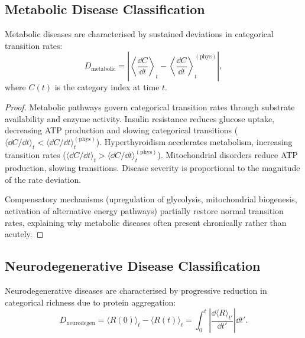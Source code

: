 \subsection{Metabolic Disease Classification}
\label{sec:ch07-metabolic-disease}

\begin{theorem}
\label{thm:ch07-metabolic-disease}
Metabolic diseases are characterised by sustained deviations in categorical
transition rates:
\begin{equation}
  D_{\mathrm{metabolic}}
  = \left|\left\langle\frac{\dd C}{\dd t}\right\rangle_t
    - \left\langle\frac{\dd C}{\dd t}\right\rangle_t^{(\mathrm{phys})}\right|,
  \label{eq:ch07-metabolic-disease}
\end{equation}
where $C(t)$ is the category index at time $t$.
\end{theorem}

\begin{proof}
Metabolic pathways govern categorical transition rates through substrate
availability and enzyme activity.  Insulin resistance reduces glucose
uptake, decreasing ATP production and slowing categorical transitions
($\langle \dd C/\dd t\rangle_t < \langle \dd C/\dd t\rangle_t^{(\mathrm{phys})}$).
Hyperthyroidism accelerates metabolism, increasing transition rates
($\langle \dd C/\dd t\rangle_t > \langle \dd C/\dd t\rangle_t^{(\mathrm{phys})}$).
Mitochondrial disorders reduce ATP production, slowing transitions.  Disease
severity is proportional to the magnitude of the rate deviation.

Compensatory mechanisms (upregulation of glycolysis, mitochondrial
biogenesis, activation of alternative energy pathways) partially restore
normal transition rates, explaining why metabolic diseases often present
chronically rather than acutely.
\end{proof}

\subsection{Neurodegenerative Disease Classification}
\label{sec:ch07-neurodegen}

\begin{theorem}
\label{thm:ch07-neurodegen}
Neurodegenerative diseases are characterised by progressive reduction in
categorical richness due to protein aggregation:
\begin{equation}
  D_{\mathrm{neurodegen}}
  = \langle R(0)\rangle_t - \langle R(t)\rangle_t
  = \int_0^t \left|\frac{\dd\langle R\rangle_{t'}}{\dd t'}\right| \dd t'.
  \label{eq:ch07-neurodegen}
\end{equation}
\end{theorem}

